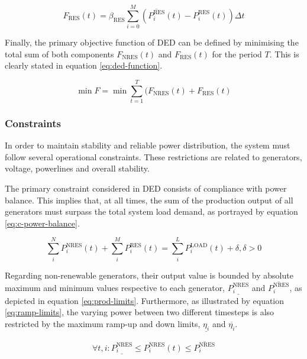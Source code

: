 \begin{equation} \label{eq:res-cost}
	F_\text{RES}(t) = \beta_\text{RES} \sum^M_{i=0}  (\overline{P^\text{RES}_i}(t) - P^\text{RES}_i(t)) \Delta t 
\end{equation}

Finally, the primary objective function of \ac{DED} can be defined by minimising the total sum of both components $F_\text{NRES}(t)$ and $F_\text{RES}(t)$ for the period $T$. This is clearly stated in equation \ref{eq:ded-function}.

\begin{equation} \label{eq:ded-function}
	\min F =  \min\sum^T_{t=1}(F_\text{NRES}(t) + F_{\text{RES}}(t)
\end{equation}

\subsubsection{Constraints} \label{sec:constraints}

In order to maintain stability and reliable power distribution, the system must follow several operational constraints. These restrictions are related to generators, voltage, powerlines and overall stability.  \par

The primary constraint considered in \ac{DED} consists of compliance with power balance. This implies that, at all times, the sum of the production output of all generators must surpass the total system load demand, as portrayed by equation \ref{eq:c-power-balance}. 

\begin{equation} \label{eq:c-power-balance}
	\sum^N_i P^\text{NRES}_i(t) + \sum^M_i P^\text{RES}_i(t) = \sum^L_i P^\text{LOAD}_i(t) + \delta, \delta > 0
\end{equation}

Regarding non-renewable generators, their output value is bounded by absolute maximum and minimum values respective to each generator, $\underline{P^\text{NRES}_i}$ and $\overline{P^\text{NRES}_i}$, as depicted in equation \ref{eq:prod-limits}. Furthermore, as illustrated by equation \ref{eq:ramp-limits}, the varying power between two different timesteps is also restricted by the maximum ramp-up and down limits, $\underline{\eta_i }$ and $\overline{\eta_i }$. \par

\begin{equation} \label{eq:prod-limits}
	\forall t, i: \underline{P^\text{NRES}_i} \leq P^\text{NRES}_i(t) \leq \overline{P^\text{NRES}_i}
\end{equation}

